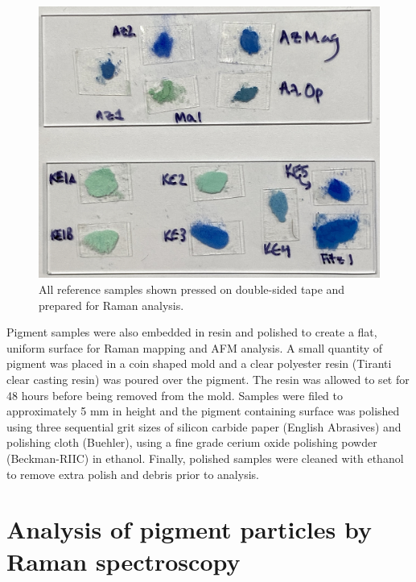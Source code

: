 \begin{figure}[H]
\centering
  \includegraphics[width=0.75\linewidth]{sample_slides}
\caption[All reference samples shown pressed on double-sided tape and prepared for Raman analysis.]{All reference samples shown pressed on double-sided tape and prepared for Raman analysis.}
\label{fig:sample_slides}
\end{figure}

Pigment samples were also embedded in resin and polished to create a flat, uniform surface for Raman mapping and AFM analysis. A small quantity of pigment was placed in a coin shaped mold and a clear polyester resin (Tiranti clear casting resin) was poured over the pigment. The resin was allowed to set for 48 hours before being removed from the mold. Samples were filed to approximately 5 mm in height and the pigment containing surface was polished using three sequential grit sizes of silicon carbide paper (English Abrasives) and polishing cloth (Buehler), using a fine grade cerium oxide polishing powder (Beckman-RIIC) in ethanol. Finally, polished samples were cleaned with ethanol to remove extra polish and debris prior to analysis.

\section[Analysis of pigment particles by Raman spectroscopy]{Analysis of pigment particles by Raman spectroscopy}
\label{section2.2}

